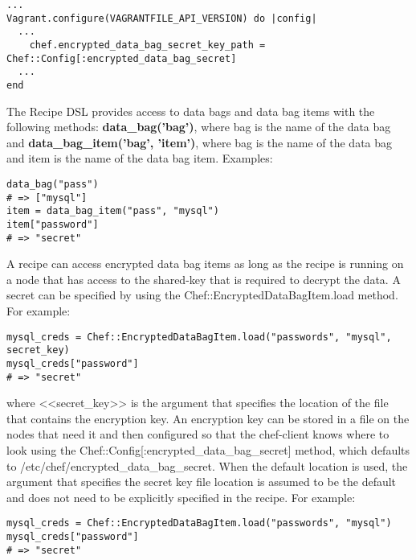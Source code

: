 \begin{lstlisting}[label=lst:my-cloud-chef-databag12,title=my-cloud/Vagrantfile]
...
Vagrant.configure(VAGRANTFILE_API_VERSION) do |config|
  ...
    chef.encrypted_data_bag_secret_key_path = Chef::Config[:encrypted_data_bag_secret]
  ...
end
\end{lstlisting}

The Recipe DSL provides access to data bags and data bag items with the following methods: \textbf{data\_bag('bag')}, where bag is the name of the data bag and \textbf{data\_bag\_item('bag', 'item')}, where bag is the name of the data bag and item is the name of the data bag item. Examples:

\begin{lstlisting}[label=lst:my-cloud-chef-databag13,title=my-cloud/Vagrantfile]
data_bag("pass")
# => ["mysql"]
item = data_bag_item("pass", "mysql")
item["password"]
# => "secret"
\end{lstlisting}

A recipe can access encrypted data bag items as long as the recipe is running on a node that has access to the shared-key that is required to decrypt the data. A secret can be specified by using the Chef::EncryptedDataBagItem.load method. For example:

\begin{lstlisting}[label=lst:my-cloud-chef-databag14,title=my-cloud/Vagrantfile]
mysql_creds = Chef::EncryptedDataBagItem.load("passwords", "mysql", secret_key)
mysql_creds["password"]
# => "secret"
\end{lstlisting}

where <<secret\_key>> is the argument that specifies the location of the file that contains the encryption key. An encryption key can be stored in a file on the nodes that need it and then configured so that the chef-client knows where to look using the Chef::Config[:encrypted\_data\_bag\_secret] method, which defaults to /etc/chef/encrypted\_data\_bag\_secret. When the default location is used, the argument that specifies the secret key file location is assumed to be the default and does not need to be explicitly specified in the recipe. For example:

\begin{lstlisting}[label=lst:my-cloud-chef-databag14,title=my-cloud/Vagrantfile]
mysql_creds = Chef::EncryptedDataBagItem.load("passwords", "mysql")
mysql_creds["password"]
# => "secret"
\end{lstlisting}
